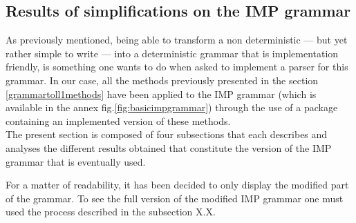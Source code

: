 \documentclass[a4paper,11pt]{article}
\begin{document}
  \subsection{Results of simplifications on the IMP grammar}
    As previously mentioned, being able to transform a non deterministic --- but yet rather simple to write --- into a deterministic grammar that is implementation friendly, is something one wants to do when asked to implement a parser for this grammar. In our case, all the methods previously presented in the section \ref{grammartoll1methods} have been applied to the IMP grammar (which is available in the annex fig.\ref{fig:basicimpgrammar}) through the use of a package containing an implemented version of these methods.\\
    The present section is composed of four subsections that each describes and analyses the different results obtained that constitute the version of the IMP grammar that is eventually used.\\
    \begin{tcolorbox}
      For a matter of readability, it has been decided to only display the modified part of the grammar. To see the full version of the modified IMP grammar one must used the process described in the subsection X.X.
    \end{tcolorbox}
\end{document}
